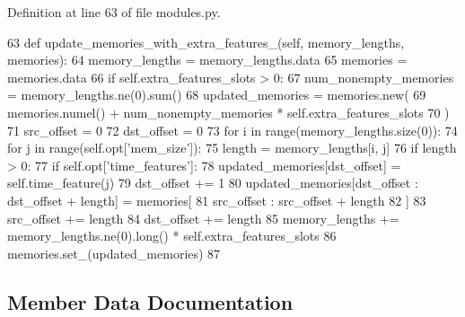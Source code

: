 Definition at line 63 of file modules.\+py.


\begin{DoxyCode}
63     \textcolor{keyword}{def }update\_memories\_with\_extra\_features\_(self, memory\_lengths, memories):
64         memory\_lengths = memory\_lengths.data
65         memories = memories.data
66         \textcolor{keywordflow}{if} self.extra\_features\_slots > 0:
67             num\_nonempty\_memories = memory\_lengths.ne(0).sum()
68             updated\_memories = memories.new(
69                 memories.numel() + num\_nonempty\_memories * self.extra\_features\_slots
70             )
71             src\_offset = 0
72             dst\_offset = 0
73             \textcolor{keywordflow}{for} i \textcolor{keywordflow}{in} range(memory\_lengths.size(0)):
74                 \textcolor{keywordflow}{for} j \textcolor{keywordflow}{in} range(self.opt[\textcolor{stringliteral}{'mem\_size'}]):
75                     length = memory\_lengths[i, j]
76                     \textcolor{keywordflow}{if} length > 0:
77                         \textcolor{keywordflow}{if} self.opt[\textcolor{stringliteral}{'time\_features'}]:
78                             updated\_memories[dst\_offset] = self.time\_feature(j)
79                             dst\_offset += 1
80                         updated\_memories[dst\_offset : dst\_offset + length] = memories[
81                             src\_offset : src\_offset + length
82                         ]
83                         src\_offset += length
84                         dst\_offset += length
85             memory\_lengths += memory\_lengths.ne(0).long() * self.extra\_features\_slots
86             memories.set\_(updated\_memories)
87 
\end{DoxyCode}


\subsection{Member Data Documentation}
\mbox{\label{classprojects_1_1memnn__feedback_1_1agent_1_1modules_1_1MemNN_ac1ace4846a98bc2613e2226235254002}} 
